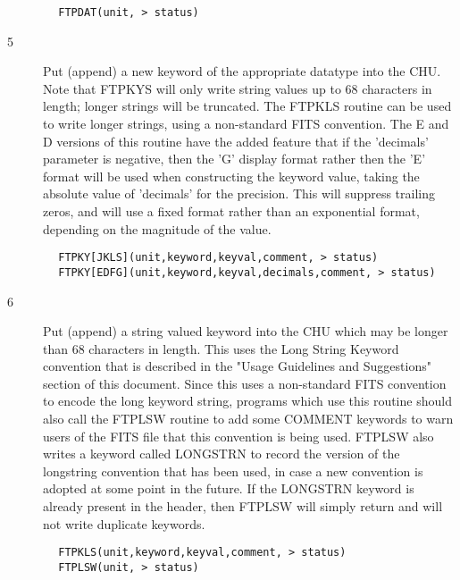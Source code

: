 \documentclass[11pt]{book}
\begin{document}
\begin{verbatim}
        FTPDAT(unit, > status)
\end{verbatim}

\begin{description}
\item[5 ] Put (append) a new keyword of the appropriate datatype into the CHU.
    Note that FTPKYS will only write string values up to 68 characters in
    length; longer strings will be truncated.  The FTPKLS routine can be
    used to write longer strings, using a non-standard FITS convention.
     The E and D versions of this routine have the added feature that
     if the 'decimals' parameter is negative, then the 'G' display
     format rather then the 'E' format will be used when constructing
     the keyword value, taking the absolute value of 'decimals' for the
     precision.  This will suppress trailing zeros, and will use a
     fixed format rather than an exponential format,
    depending on the magnitude of the value.
\end{description}

\begin{verbatim}
        FTPKY[JKLS](unit,keyword,keyval,comment, > status)
        FTPKY[EDFG](unit,keyword,keyval,decimals,comment, > status)
\end{verbatim}

\begin{description}
\item[6 ] Put (append) a string valued keyword into the CHU which may be longer
    than 68 characters in length.  This uses the Long String Keyword
    convention that is described in the "Usage Guidelines and Suggestions"
    section of this document.  Since this uses a non-standard FITS
    convention to encode the long keyword string, programs which use
    this routine should also call the FTPLSW routine to add some COMMENT
    keywords to warn users of the FITS file that this convention is
    being used.  FTPLSW also writes a keyword called LONGSTRN to record
    the version of the longstring convention that has been used, in case
    a new convention is adopted at some point in the future.   If the
    LONGSTRN keyword is already present in the header, then FTPLSW will
   simply return and will not write duplicate keywords.
\end{description}

\begin{verbatim}
        FTPKLS(unit,keyword,keyval,comment, > status)
        FTPLSW(unit, > status)
\end{verbatim}
\end{document}
